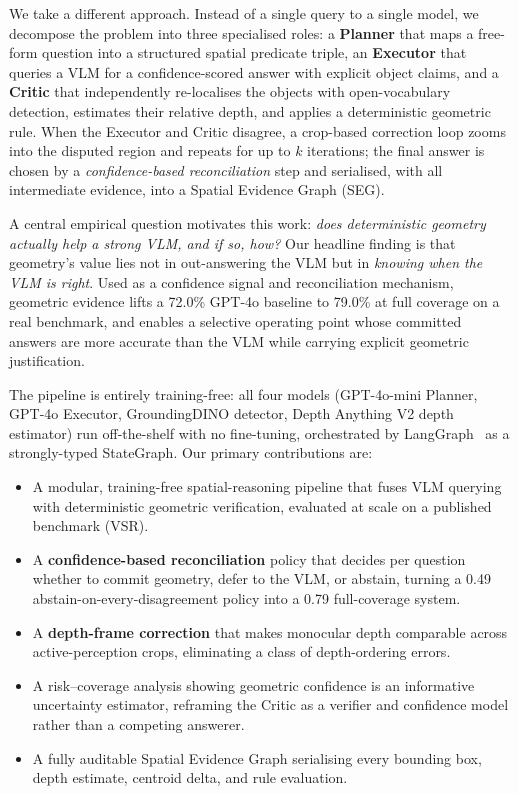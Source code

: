 \documentclass[10pt,twocolumn,letterpaper]{article}
\begin{document}
We take a different approach. Instead of a single query to a single model, we
decompose the problem into three specialised roles: a \textbf{Planner} that
maps a free-form question into a structured spatial predicate triple, an
\textbf{Executor} that queries a VLM for a confidence-scored answer with
explicit object claims, and a \textbf{Critic} that independently re-localises
the objects with open-vocabulary detection, estimates their relative depth,
and applies a deterministic geometric rule. When the Executor and Critic
disagree, a crop-based correction loop zooms into the disputed region and
repeats for up to $k$ iterations; the final answer is chosen by a
\emph{confidence-based reconciliation} step and serialised, with all
intermediate evidence, into a Spatial Evidence Graph (SEG).

A central empirical question motivates this work: \emph{does deterministic
geometry actually help a strong VLM, and if so, how?} Our headline finding is
that geometry's value lies not in out-answering the VLM but in \emph{knowing
when the VLM is right}. Used as a confidence signal and reconciliation
mechanism, geometric evidence lifts a 72.0\% GPT-4o baseline to 79.0\% at full
coverage on a real benchmark, and enables a selective operating point whose
committed answers are more accurate than the VLM while carrying explicit
geometric justification.

The pipeline is entirely training-free: all four models (GPT-4o-mini Planner,
GPT-4o Executor, GroundingDINO detector, Depth Anything V2 depth estimator)
run off-the-shelf with no fine-tuning, orchestrated by
LangGraph~\cite{langgraph} as a strongly-typed StateGraph. Our primary
contributions are:
\begin{itemize}
\item A modular, training-free spatial-reasoning pipeline that fuses VLM
querying with deterministic geometric verification, evaluated at scale on a
published benchmark (VSR).
\item A \textbf{confidence-based reconciliation} policy that decides per
question whether to commit geometry, defer to the VLM, or abstain, turning a 0.49
abstain-on-every-disagreement policy into a 0.79 full-coverage system.
\item A \textbf{depth-frame correction} that makes monocular depth comparable
across active-perception crops, eliminating a class of depth-ordering errors.
\item A risk--coverage analysis showing geometric confidence is an
informative uncertainty estimator, reframing the Critic as a verifier and
confidence model rather than a competing answerer.
\item A fully auditable Spatial Evidence Graph serialising every bounding box,
depth estimate, centroid delta, and rule evaluation.
\end{itemize}
\end{document}
